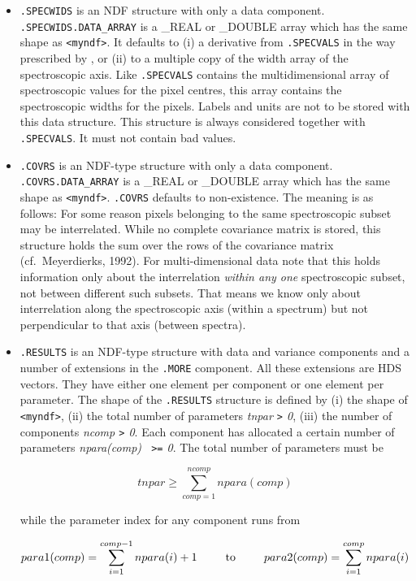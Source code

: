 \begin{itemize}
\item{\tt .SPECWIDS} is an NDF structure with only a data component.
   {\tt .SPECWIDS.DATA\_\-ARRAY} is a \_REAL or \_DOUBLE array which has
   the same shape as {\tt <myndf>}. It defaults to (i) a derivative from
   {\tt .SPECVALS} in the way prescribed by
,
   or (ii) to a multiple copy of the width array of the spectroscopic
   axis. Like {\tt .SPECVALS} contains the multidimensional array of
   spectroscopic values for the pixel centres, this array contains the
   spectroscopic widths for the pixels. Labels and units are not to be
   stored with this data structure. This structure is always considered
   together with {\tt .SPECVALS}. It must not contain bad values.

\item{\tt .COVRS} is an NDF-type structure with only a data component.
   {\tt .COVRS.DATA\_ARRAY} is a \_REAL or \_DOUBLE array which has the
   same shape as {\tt <myndf>}. {\tt .COVRS} defaults to
   non-existence. The meaning is as follows: For some reason pixels
   belonging to the same spectroscopic subset may be interrelated. While
   no complete covariance matrix is stored, this structure holds the sum
   over the rows of the covariance matrix (cf.\ Meyerdierks, 1992). For
   multi-dimensional data note that this holds information only about
   the interrelation {\it within any one} spectroscopic subset, not
   between different such subsets. That means we know only about
   interrelation along the spectroscopic axis (within a spectrum) but
   not perpendicular to that axis (between spectra).

\item{\tt .RESULTS} is an NDF-type structure with data and variance
   components and a number of extensions in the {\tt .MORE}
   component. All these extensions are HDS vectors. They have either one
   element per component or one element per parameter. The shape of the
   {\tt .RESULTS} structure is defined by (i) the shape of {\tt
   <myndf>}, (ii) the total number of parameters {\it tnpar {\tt>} 0},
   (iii) the number of components {\it ncomp {\tt>} 0}. Each component
   has allocated a certain number of parameters {\it npara(comp) {\tt
   >=} 0}. The total number of parameters must be

   \[tnpar\geq\sum_{comp=1}^{ncomp}npara(comp)\]

   while the parameter index for any component runs from

   \[para1(comp)=\sum_{i=1}^{comp-1}npara(i)+1
   \mbox{\phantom{mmm}to\phantom{mmm}}
   para2(comp)=\sum_{i=1}^{comp}npara(i)\]


\end{itemize}
